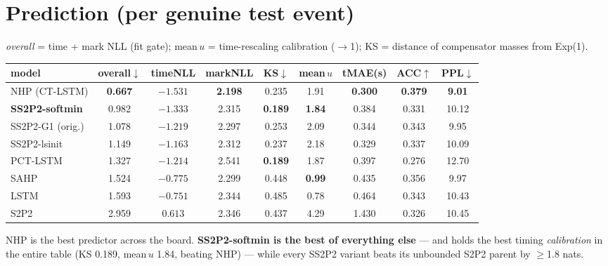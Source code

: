 \documentclass[11pt]{article}
\newcommand{\bb}[1]{\textbf{#1}}
\begin{document}
\section{Prediction (per genuine test event)}
\emph{overall} = time + mark NLL (fit gate); mean\,$u$ = time-rescaling calibration ($\to$1);
KS = distance of compensator masses from Exp(1).
\begin{center}\small\renewcommand{\arraystretch}{1.22}
\begin{tabular}{lcccccccc}
\toprule
model & overall$\downarrow$ & timeNLL & markNLL & KS$\downarrow$ & mean\,$u$ & tMAE(s) & ACC$\uparrow$ & PPL$\downarrow$\\
\midrule
\rowcolor{best}NHP (CT-LSTM) & \bb{0.667} & \bb{$-1.531$} & \bb{2.198} & 0.235 & 1.91 & \bb{0.300} & \bb{0.379} & \bb{9.01}\\
\rowcolor{ours}\textbf{SS2P2-softmin} & 0.982 & $-1.333$ & 2.315 & \bb{0.189} & \bb{1.84} & 0.384 & 0.331 & 10.12\\
\rowcolor{ours}SS2P2-G1 (orig.) & 1.078 & $-1.219$ & 2.297 & 0.253 & 2.09 & 0.344 & 0.343 & 9.95\\
\rowcolor{ours}SS2P2-lsinit & 1.149 & $-1.163$ & 2.312 & 0.237 & 2.18 & 0.329 & 0.337 & 10.09\\
PCT-LSTM & 1.327 & $-1.214$ & 2.541 & \bb{0.189} & 1.87 & 0.397 & 0.276 & 12.70\\
SAHP & 1.524 & $-0.775$ & 2.299 & 0.448 & \bb{0.99} & 0.435 & 0.356 & 9.97\\
LSTM & 1.593 & $-0.751$ & 2.344 & 0.485 & 0.78 & 0.464 & 0.343 & 10.43\\
S2P2 & 2.959 & $0.613$ & 2.346 & 0.437 & 4.29 & 1.430 & 0.326 & 10.45\\
\bottomrule
\end{tabular}
\end{center}
\noindent NHP is the best predictor across the board. \textbf{SS2P2-softmin is the best of everything else}
--- and holds the best timing \emph{calibration} in the entire table (KS 0.189, mean\,$u$ 1.84, beating NHP)
--- while every SS2P2 variant beats its unbounded S2P2 parent by $\ge$1.8 nats.
\end{document}
